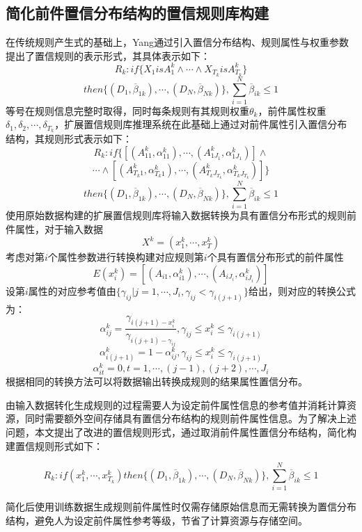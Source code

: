\documentclass{cjc}
\begin{document}
\subsection{简化前件置信分布结构的置信规则库构建}
在传统规则产生式的基础上，Yang\cite{a3}通过引入置信分布结构、规则属性与权重参数提出了置信规则的表示形式，其具体表示如下：
$$R_k:if\{X_1isA_1^k \wedge \cdots \wedge X_{T_k}isA_{T_k}^k\}$$
$$then\{(D_1,\overline{\beta}_{1k}),\cdots,(D_N,\overline{\beta}_{Nk})\},\sum_{i=1}^N\overline{\beta}_{ik}\leq1$$
等号在规则信息完整时取得，同时每条规则有其规则权重$\theta_k$，前件属性权重$\delta_{1},\delta_{2},\cdots,\delta_{T_k}$，扩展置信规则库推理系统在此基础上通过对前件属性引入置信分布结构，其规则形式表示如下：
$$R_k:if\{[(A_{11}^k,\alpha_{11}^k),\cdots,(A_{1J_1}^k,\alpha_{1J_1}^k)] \wedge $$
$$\cdots \wedge [(A_{T_k1}^k,\alpha_{T_k1}^k), \cdots,(A_{T_kJ_{T_k}}^k,\alpha_{T_kJ_{T_k}}^k)]\}$$
$$then\{(D_1,\overline{\beta}_{1k}),\cdots,(D_N,\overline{\beta}_{Nk})\},\sum_{i=1}^N\overline{\beta}_{ik}\leq1$$
使用原始数据构建的扩展置信规则库将输入数据转换为具有置信分布形式的规则前件属性，对于输入数据
$$X^k=(x_1^k,\cdots,x_T^k)$$
考虑对第$i$个属性参数进行转换构建对应规则第$i$个具有置信分布形式的前件属性
$$E(x_i^k)=[(A_{i1},\alpha_{i1}^k),\cdots,(A_{iJ_i},\alpha_{iJ_i}^k)]$$
设第$i$属性的对应参考值由$\{\gamma_{ij}|j=1,\cdots,J_i,\gamma_{ij}<\gamma_{i(j+1)}\}$给出，则对应的转换公式为：
$$\alpha_{ij}^k=\frac{\gamma_{i(j+1)-x_i^k}}{\gamma_{i(j+1)-\gamma_{ij}}},\gamma_{ij}\leq x_i^k\leq \gamma_{i(j+1)}$$
$$\alpha_{i(j+1)}^k=1-\alpha_{ij}^k,\gamma_{ij}\leq x_i^k\leq \gamma_{i(j+1)}$$
$$\alpha_{it}^k=0,t=1,\cdots,(j-1),(j+2),\cdots,J_i$$
根据相同的转换方法可以将数据输出转换成规则的结果属性置信分布。

由输入数据转化生成规则的过程需要人为设定前件属性信息的参考值并消耗计算资源，同时需要额外空间存储具有置信分布结构的规则前件属性信息。为了解决上述问题，本文提出了改进的置信规则形式，通过取消前件属性置信分布结构，简化构建置信规则形式如下：
\begin{small}
	$$R_k:if(x_1^k , \cdots , x_{T_k}^k)then\{(D_1,\overline{\beta}_{1k}),\cdots,(D_N,\overline{\beta}_{Nk})\},\sum_{i=1}^N\overline{\beta}_{ik}\leq1$$	
\end{small}
简化后使用训练数据生成规则前件属性时仅需存储原始信息而无需转换为置信分布结构，避免人为设定前件属性参考等级，节省了计算资源与存储空间。
\end{document}
